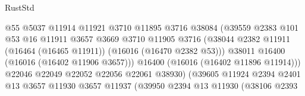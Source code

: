 \begin{lexlean}{RustStd}
\begin{coremodule}
                                            @55
                                            @5037
                                            @11914
                                            @11921
                                            @3710
                                            @11895
                                            @3716
                                            @38084
                                            (@39559
                                              @2383
                                              @101
                                              @53
                                              @16
                                              @11911
                                              @3657
                                              @3669
                                              @3710
                                              @11905
                                              @3716
                                              (@38044
                                                @2382
                                                @11911
                                                (@16464 (@16465 @11911))
                                                (@16016 (@16470 @2382 @53)))
                                              @38011
                                              @16400
                                              (@16016 (@16402 @11906 @3657)))
                                            @16400
                                            (@16016 (@16402 @11896 @11914)))
                                          @22046
                                          @22049
                                          @22052
                                          @22056
                                          @22061
                                          @38930)
                                        (@39605
                                          @11924
                                          @2394
                                          @2401
                                          @13
                                          @3657
                                          @11930
                                          @3657
                                          @11937
                                          (@39950
                                            @2394
                                            @13
                                            @11930
                                            (@38106
                                              @2393

\end{coremodule}
\end{lexlean}
